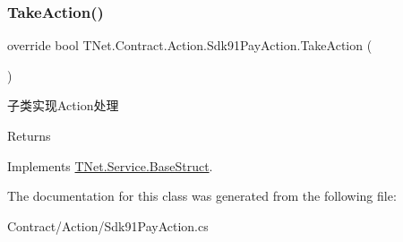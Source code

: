 \subsubsection{\texorpdfstring{Take\+Action()}{TakeAction()}}
{\footnotesize\ttfamily override bool T\+Net.\+Contract.\+Action.\+Sdk91\+Pay\+Action.\+Take\+Action (\begin{DoxyParamCaption}{ }\end{DoxyParamCaption})\hspace{0.3cm}{\ttfamily [virtual]}}



子类实现\+Action处理 

\begin{DoxyReturn}{Returns}

\end{DoxyReturn}


Implements \mbox{\hyperlink{class_t_net_1_1_service_1_1_base_struct_a5a1250b74d925d42066aebdefa36f54a}{T\+Net.\+Service.\+Base\+Struct}}.



The documentation for this class was generated from the following file\+:\begin{DoxyCompactItemize}
\item 
Contract/\+Action/Sdk91\+Pay\+Action.\+cs\end{DoxyCompactItemize}
